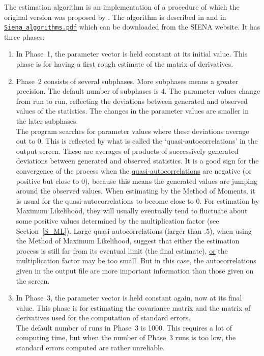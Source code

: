 \documentclass[a4paper,fleqn,11pt]{article}
\newcommand{\+}{\, + \,}
\newcommand{\SI}{{\sf SIENA }}
\begin{document}
The estimation algorithm is an implementation of a procedure of which
the original version was proposed by \citet{RobbinsMonro51}.
The algorithm is
described in \citet{Snijders01, Snijders05}
and in
\href{http://www.stats.ox.ac.uk/~snijders/siena/Siena_algorithms.pdf}{\texttt{Siena\_algorithms.pdf}}
which can be downloaded from the \SI website.
It has %
three phases:
\begin{enumerate}
\item In Phase~1, the parameter vector is held constant at its
initial value.
      This phase is for
      having a first rough estimate of the matrix of derivatives.
\item Phase~2 consists of several subphases.
      More subphases means a greater precision. The default
      number of subphases is 4.
      The parameter values change from run to run, reflecting
      the deviations between generated and observed values of the
      statistics. The changes in the parameter values are smaller
      in the later subphases.\\
      The program searches for parameter values where these deviations
      average out to 0. This is reflected by what is called the
      \hypertarget{T_quasiac}{`quasi-auto\-cor\-relations'}
      in the output screen.
      These are averages
      of products of successively generated deviations between
      generated and observed statistics. It is a good sign
      for the convergence of the process when the
      \hyperlink{T_quasiac}{quasi-auto\-correlations}
      are negative (or positive but close to 0),
      because this means the generated values are jumping
      around the observed values.
      When estimating by the Method of Moments, it is usual for the
      quasi-auto\-correlations to become close to 0.
      For estimation by Maximum Likelihood, they will usually
      eventually tend to fluctuate about some positive values
      determined by the multiplication factor (see Section~\ref{S_ML}).
      Large quasi-auto\-correlations (larger than .5), when using the Method of
      Maximum Likelihood, suggest that either the estimation process
      is still far from its eventual limit (the final estimate), \underline{or}
      the multiplication factor may be too small.
      But in this case, the auto\-correlations given in the output file
      are more important information than those given on the screen.
\item In Phase~3, the parameter vector is held constant again,
      now at its final value.
      This phase is for estimating the covariance matrix and the
      matrix of derivatives used for the computation of standard errors.\\
      The default number of runs in Phase~3 is 1000. This requires a lot
      of computing time, but when the number of Phase~3 runs is too low,
      the standard errors computed are rather unreliable.
\end{enumerate}
\end{document}
